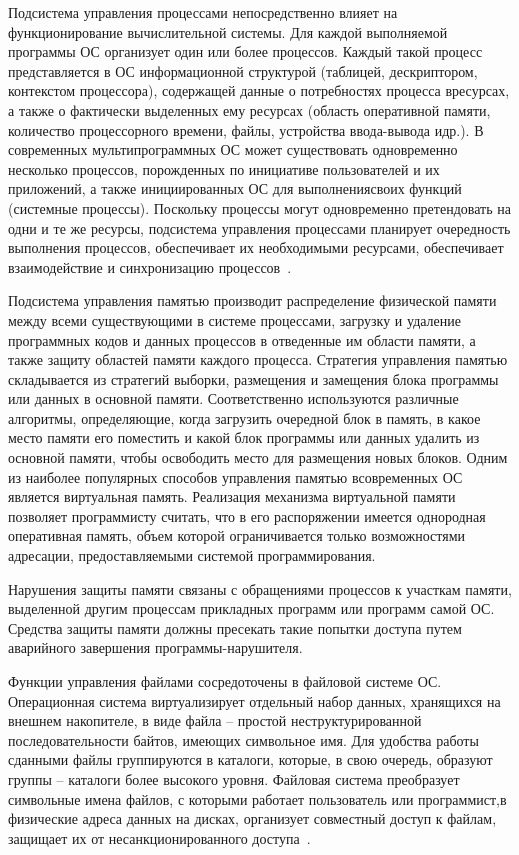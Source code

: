 Подсистема   управления   процессами   непосредственно   влияет   на функционирование   вычислительной   системы.   Для   каждой   выполняемой программы ОС организует один или более процессов. Каждый такой процесс представляется в ОС информационной структурой (таблицей, дескриптором, контекстом процессора),   содержащей   данные   о   потребностях   процесса   вресурсах, а также о фактически выделенных ему ресурсах (область оперативной памяти, количество процессорного времени, файлы, устройства ввода-вывода идр.).   В   современных   мультипрограммных   ОС   может   существовать одновременно   несколько   процессов,   порожденных   по   инициативе пользователей и их приложений, а также инициированных ОС для выполнениясвоих   функций   (системные   процессы).   Поскольку   процессы   могут одновременно претендовать на одни и те же ресурсы, подсистема управления процессами планирует очередность выполнения процессов, обеспечивает их необходимыми   ресурсами,   обеспечивает   взаимодействие   и   синхронизацию процессов~\cite{Oc2}.

Подсистема управления памятью производит распределение физической памяти   между   всеми   существующими   в   системе   процессами,   загрузку   и удаление программных кодов и данных процессов в отведенные им области памяти,   а   также   защиту   областей   памяти   каждого   процесса.   Стратегия управления   памятью   складывается   из   стратегий   выборки,   размещения   и замещения блока программы или данных в основной памяти. Соответственно используются различные алгоритмы, определяющие, когда загрузить очередной блок в память, в какое место памяти его поместить и какой блок программы или данных удалить из основной памяти, чтобы освободить место для размещения новых блоков. Одним из наиболее популярных способов управления памятью всовременных   ОС   является   виртуальная   память.   Реализация   механизма виртуальной памяти позволяет программисту считать, что в его распоряжении имеется однородная оперативная память, объем которой ограничивается только возможностями адресации, предоставляемыми системой программирования.

Нарушения защиты памяти связаны с обращениями процессов к участкам памяти, выделенной другим процессам прикладных программ или программ самой ОС. Средства защиты памяти должны пресекать такие попытки доступа путем аварийного завершения программы-нарушителя.

Функции управления файлами сосредоточены в файловой системе ОС. Операционная система виртуализирует отдельный набор данных, хранящихся на   внешнем   накопителе,   в   виде   файла   –   простой   неструктурированной последовательности байтов, имеющих символьное имя. Для удобства работы сданными файлы группируются в каталоги, которые, в свою очередь, образуют группы – каталоги более высокого уровня. Файловая система преобразует символьные имена файлов, с которыми работает пользователь или программист,в физические адреса данных на дисках, организует совместный доступ к файлам, защищает их от несанкционированного доступа~\cite{Oc2}.


